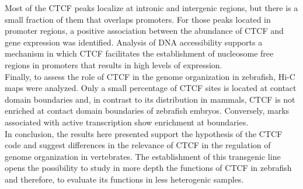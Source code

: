 			Most of the CTCF peaks localize at intronic and intergenic regions, but there is a small fraction of them that overlaps promoters. For those peaks located in promoter regions, a positive association between the abundance of CTCF and gene expression was identified. Analysis of DNA accessibility supports a mechanism in which CTCF facilitates the establishment of nucleosome free regions in promoters that results in high levels of expression.\\

			Finally, to assess the role of CTCF in the genome organization in zebrafish, Hi-C maps were analyzed. Only a small percentage of CTCF sites is located at contact domain boundaries and, in contrast to its distribution in mammals, CTCF is not enriched at contact domain boundaries of zebrafish embryos. Conversely, marks associated with active transcription show enrichment at boundaries.\\

			In conclusion, the results here presented support the hypothesis of the CTCF code and suggest differences in the relevance of CTCF in the regulation of genome organization in vertebrates. The establishment of this transgenic line opens the possibility to study in more depth the functions of CTCF in zebrafish and therefore, to evaluate its functions in less heterogenic samples.\\


		

		\setcounter{figure}{0}

